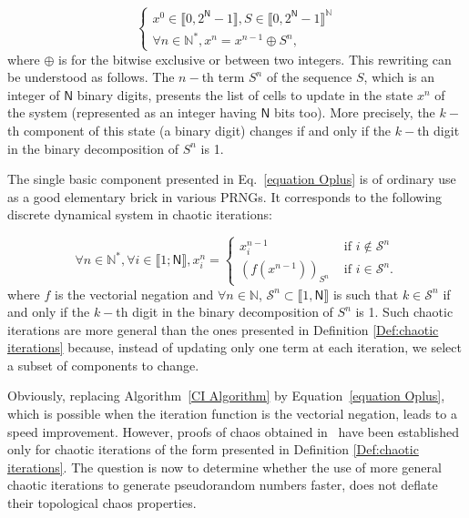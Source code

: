 \documentclass{article}
\begin{document}
\begin{equation}
\left\{
\begin{array}{l}
x^0 \in \llbracket 0, 2^\mathsf{N}-1 \rrbracket, S \in \llbracket 0, 2^\mathsf{N}-1 \rrbracket^\mathds{N} \\
\forall n \in \mathds{N}^*, x^n = x^{n-1} \oplus S^n,
\end{array}
\right.
\label{equation Oplus}
\end{equation}
where $\oplus$ is for the bitwise exclusive or between two integers. 
This rewriting can be understood as follows. The $n-$th term $S^n$ of the
sequence $S$, which is an integer of $\mathsf{N}$ binary digits, presents
the list of cells to update in the state $x^n$ of the system (represented
as an integer having $\mathsf{N}$ bits too). More precisely, the $k-$th 
component of this state (a binary digit) changes if and only if the $k-$th 
digit in the binary decomposition of $S^n$ is 1.

The single basic component presented in Eq.~\ref{equation Oplus} is of 
ordinary use as a good elementary brick in various PRNGs. It corresponds
to the following discrete dynamical system in chaotic iterations:

\begin{equation}
\forall    n\in     \mathds{N}^{\ast     },    \forall     i\in
\llbracket1;\mathsf{N}\rrbracket ,x_i^n=\left\{
\begin{array}{ll}
  x_i^{n-1} &  \text{ if  } i \notin \mathcal{S}^n \\
  \left(f(x^{n-1})\right)_{S^n} & \text{ if }i \in \mathcal{S}^n.
\end{array}\right.
\label{eq:generalIC}
\end{equation}
where $f$ is the vectorial negation and $\forall n \in \mathds{N}$, 
$\mathcal{S}^n \subset \llbracket 1, \mathsf{N} \rrbracket$ is such that
$k \in \mathcal{S}^n$ if and only if the $k-$th digit in the binary
decomposition of $S^n$ is 1. Such chaotic iterations are more general
than the ones presented in Definition \ref{Def:chaotic iterations} because, instead of updating only one term at each iteration,
we select a subset of components to change.


Obviously, replacing Algorithm~\ref{CI Algorithm} by 
Equation~\ref{equation Oplus}, which is possible when the iteration function is
the vectorial negation, leads to a speed improvement. However, proofs
of chaos obtained in~\cite{bg10:ij} have been established
only for chaotic iterations of the form presented in Definition 
\ref{Def:chaotic iterations}. The question is now to determine whether the
use of more general chaotic iterations to generate pseudorandom numbers 
faster, does not deflate their topological chaos properties.
\end{document}
